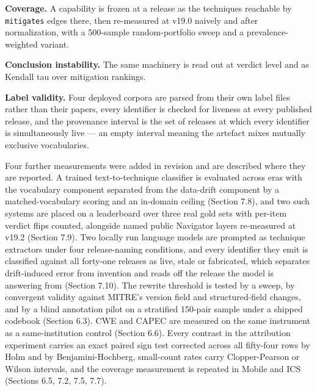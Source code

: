 \documentclass[11pt,a4paper]{article}
\begin{document}
\textbf{Coverage.} A capability is frozen at a release as the techniques reachable by \texttt{mitigates} edges there, then re-measured at v19.0 naively and after normalization, with a 500-sample random-portfolio sweep and a prevalence-weighted variant.

\textbf{Conclusion instability.} The same machinery is read out at verdict level and as Kendall tau over mitigation rankings.

\textbf{Label validity.} Four deployed corpora are parsed from their own label files rather than their papers, every identifier is checked for liveness at every published release, and the provenance interval is the set of releases at which every identifier is simultaneously live — an empty interval meaning the artefact mixes mutually exclusive vocabularies.

Four further measurements were added in revision and are described where they are reported. A trained text-to-technique classifier is evaluated across eras with the vocabulary component separated from the data-drift component by a matched-vocabulary scoring and an in-domain ceiling (Section 7.8), and two such systems are placed on a leaderboard over three real gold sets with per-item verdict flips counted, alongside named public Navigator layers re-measured at v19.2 (Section 7.9). Two locally run language models are prompted as technique extractors under four release-naming conditions, and every identifier they emit is classified against all forty-one releases as live, stale or fabricated, which separates drift-induced error from invention and reads off the release the model is answering from (Section 7.10). The rewrite threshold is tested by a sweep, by convergent validity against MITRE's version field and structured-field changes, and by a blind annotation pilot on a stratified 150-pair sample under a shipped codebook (Section 6.3). CWE and CAPEC are measured on the same instrument as a same-institution control (Section 6.6). Every contrast in the attribution experiment carries an exact paired sign test corrected across all fifty-four rows by Holm and by Benjamini-Hochberg, small-count rates carry Clopper-Pearson or Wilson intervals, and the coverage measurement is repeated in Mobile and ICS (Sections 6.5, 7.2, 7.5, 7.7).
\end{document}
